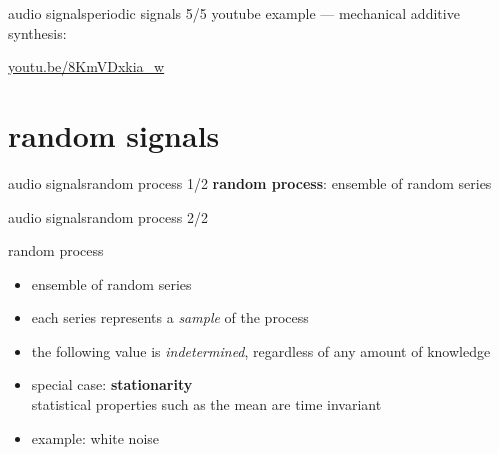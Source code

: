         \begin{frame}{audio signals}{periodic signals 5/5}
            youtube example --- mechanical additive synthesis:
            
            \bigskip
            \bigskip
            \bigskip
            \bigskip
            \begin{center}
                \href{http://youtu.be/8KmVDxkia_w}{youtu.be/8KmVDxkia\_w}
            \end{center}
        \end{frame}

    \section[random signals]{random signals}
        \begin{frame}{audio signals}{random process 1/2}
            \textbf{random process}: ensemble of random series
        \end{frame}

        \begin{frame}{audio signals}{random process 2/2}
            \begin{block}{random process}
                \begin{itemize}
                    \item   ensemble of random series
                    \item   each series represents a \textit{sample} of the process
                    \item   the following value is \textit{indetermined}, regardless of any amount of knowledge
                \end{itemize}
            \end{block}
            \begin{itemize}
                \item   special case: \textbf{stationarity}\\ statistical properties such as the mean are time invariant
                \item   example: white noise
            \end{itemize}
        \end{frame}

